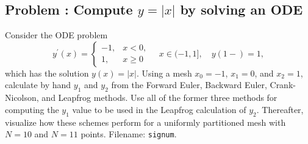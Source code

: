 \documentclass[%
oneside,                 %
final,                   %
10pt]{article}
\newenvironment{doconceexercise}{}{}
\newcounter{doconceexercisecounter}
\begin{document}
\begin{doconceexercise}

\subsection*{Problem \thedoconceexercisecounter: Compute $y=|x|$ by solving an ODE}

\label{decay:app:exer:signum}

Consider the ODE problem
\[
y^{\prime}(x) = \left\lbrace\begin{array}{ll}
-1, & x < 0,\\ 
1, & x \geq 0
\end{array}\right.\quad x\in (-1, 1],
\quad y(1-)=1,
\]
which has the solution $y(x)=|x|$.
Using a mesh $x_0=-1$, $x_1=0$, and $x_2=1$, calculate by hand
$y_1$ and $y_2$ from the Forward Euler, Backward Euler, Crank-Nicolson,
and Leapfrog methods. Use all of the former three methods for computing
the $y_1$ value to be used in the Leapfrog calculation of $y_2$.
Thereafter, visualize how these schemes perform for a uniformly partitioned
mesh with $N=10$ and $N=11$ points.
\noindent Filename: \texttt{signum}.

\end{doconceexercise}
\end{document}

